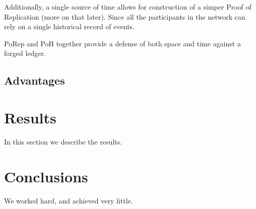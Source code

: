 \documentclass[12pt]{article}
\begin{document}
Additionally, a single source of time allows for construction of a simper Proof of Replication (more on that later).  Since all the participants in the network can rely on a single historical record of events.  

PoRep and PoH together provide a defense of both space and time against a forged ledger.

\subsection{Advantages}
\section{Results}\label{results}
In this section we describe the results.

\section{Conclusions}\label{conclusions}
We worked hard, and achieved very little.



\end{document}
